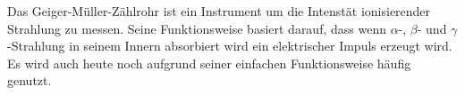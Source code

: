 Das Geiger-Müller-Zählrohr ist ein Instrument um die Intenstät ionisierender Strahlung zu messen. Seine Funktionsweise basiert darauf, dass wenn $\alpha$-, $\beta$- und $\gamma$-Strahlung in seinem Innern absorbiert wird ein elektrischer Impuls erzeugt wird. Es wird auch heute noch aufgrund seiner einfachen Funktionsweise häufig genutzt.
\FloatBarrier
